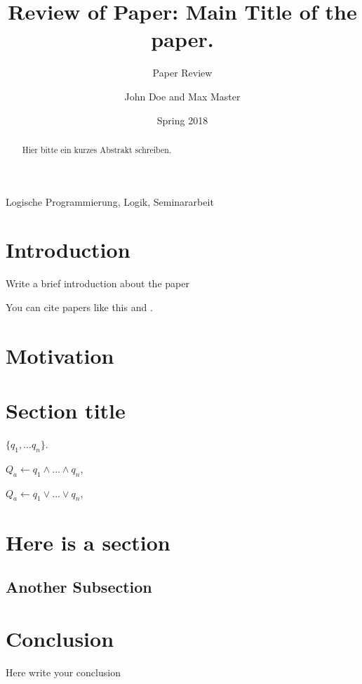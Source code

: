 \documentclass[runningheads,a4paper]{llncs}
\newcommand{\keywords}[1]{\par\addvspace\baselineskip
\noindent\keywordname\enspace\ignorespaces#1}
\begin{document}
\mainmatter

\title{Review of Paper: Main Title of the paper. }
\subtitle{Paper Review }
\date{Spring 2018}

\author{John Doe and Max Master}


\maketitle
\begin{abstract}
Hier bitte ein kurzes Abstrakt schreiben.

\end{abstract}

\keywords{Logische Programmierung, Logik, Seminararbeit}

\section{Introduction}

Write a brief introduction about the paper 

You can cite papers like this \cite{Genesereth:1985:LP:4284.4287} and  \cite{Sakama:2008:CAS:1342991.1342993}.


\section{Motivation}




\section{Section title}
 $\{q_1,...q_n\}$. 
 
 $Q_a \leftarrow  q_1 \wedge ... \wedge q_n$, 
 
 $Q_a \leftarrow  q_1 \vee ... \vee q_n$, 

\section{Here is a section}

\subsection{Another Subsection }




\section{Conclusion}
Here write your conclusion 




\end{document}
